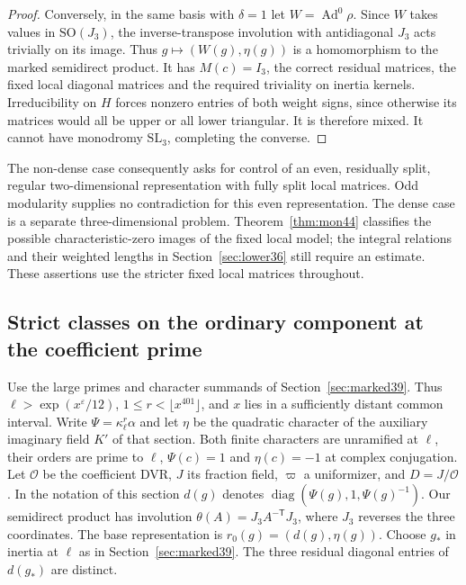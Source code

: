 \documentclass[a4paper,11pt]{article}
\theoremstyle{definition}
\theoremstyle{remark}
\numberwithin{equation}{section}
\newcommand{\OO}{\mathcal O}
\begin{document}
\begin{proof}
Conversely, in the same basis with \(\delta=1\) let \(W=\operatorname{Ad}^0\rho\). Since \(W\) takes values in \(\mathrm{SO}(J_3)\), the inverse-transpose involution with antidiagonal \(J_3\) acts trivially on its image. Thus \(g\mapsto (W(g),\eta(g))\) is a homomorphism to the marked semidirect product. It has \(M(c)=I_3\), the correct residual matrices, the fixed local diagonal matrices and the required triviality on inertia kernels. Irreducibility on \(H\) forces nonzero entries of both weight signs, since otherwise its matrices would all be upper or all lower triangular. It is therefore mixed. It cannot have monodromy \(\mathrm{SL}_3\), completing the converse.
\end{proof}

The non-dense case consequently asks for control of an even, residually split, regular two-dimensional representation with fully split local matrices. Odd modularity supplies no contradiction for this even representation. The dense case is a separate three-dimensional problem. Theorem~\ref{thm:mon44} classifies the possible characteristic-zero images of the fixed local model; the integral relations and their weighted lengths in Section~\ref{sec:lower36} still require an estimate. These assertions use the stricter fixed local matrices throughout.

\subsection{Strict classes on the ordinary component at the coefficient prime}\label{nav:IV-13}
\label{sec:original68}

Use the large primes and character summands of
Section~\ref{sec:marked39}. Thus \(\ell>\exp(x^\varepsilon/12)\),
\(1\le r<\lfloor x^{401}\rfloor\), and \(x\) lies in a sufficiently
distant common interval. Write \(\Psi=\kappa_\ell^r\alpha\) and let
\(\eta\) be the quadratic character of the auxiliary imaginary field
\(K'\) of that section. Both finite characters are unramified at
\(\ell\), their orders are prime to \(\ell\), \(\Psi(c)=1\) and
\(\eta(c)=-1\) at complex conjugation. Let \(\OO\) be the
coefficient DVR, \(J\) its fraction field, \(\varpi\) a uniformizer,
and \(D=J/\OO\). In the notation of this section \(d(g)\) denotes
\(\operatorname{diag}(\Psi(g),1,\Psi(g)^{-1})\).
Our semidirect product has involution
\(\theta(A)=J_3 A^{-\mathsf T}J_3\), where \(J_3\) reverses the
three coordinates. The base representation is \(r_0(g)=(d(g),\eta(g))\).
Choose \(g_*\) in inertia at \(\ell\) as in Section~\ref{sec:marked39}.
The three residual diagonal entries of \(d(g_*)\) are distinct.
\end{document}
